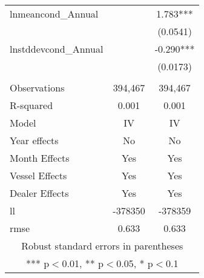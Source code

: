 \begin{tabular}{lcc}
lnmeancond\_Annual &  & 1.783*** \\
 &  & (0.0541) \\
lnstddevcond\_Annual &  & -0.290*** \\
 &  & (0.0173) \\
 &  &  \\
Observations & 394,467 & 394,467 \\
R-squared & 0.001 & 0.001 \\
Model & IV & IV \\
Year effects & No & No \\
Month Effects & Yes & Yes \\
Vessel Effects & Yes & Yes \\
Dealer Effects & Yes & Yes \\
ll & -378350 & -378359 \\
 rmse & 0.633 & 0.633 \\ \hline
\multicolumn{3}{c}{ Robust standard errors in parentheses} \\
\multicolumn{3}{c}{ *** p$<$0.01, ** p$<$0.05, * p$<$0.1} \\
\end{tabular}
